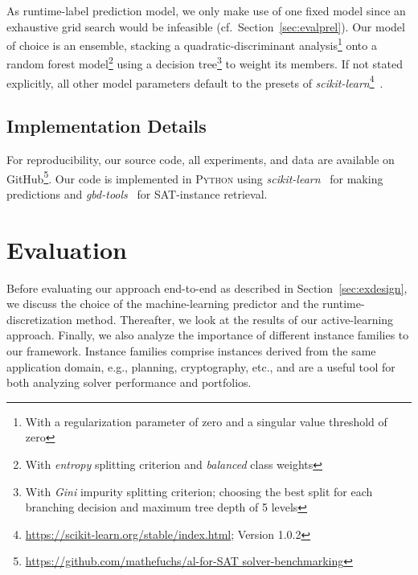 \documentclass[runningheads]{llncs}
\begin{document}
As runtime-label prediction model, we only make use of one fixed model since an exhaustive grid search would be infeasible (cf.~Section~\ref{sec:evalprel}).
Our model of choice is an ensemble, stacking a quadratic-discriminant analysis\footnote{With a regularization parameter of zero and a singular value threshold of zero} onto a random forest model\footnote{With \emph{entropy} splitting criterion and \emph{balanced} class weights} using a decision tree\footnote{With \emph{Gini} impurity splitting criterion; choosing the best split for each branching decision and maximum tree depth of 5 levels} to weight its members.
If not stated explicitly, all other model parameters default to the presets of \emph{scikit-learn}\footnote{\url{https://scikit-learn.org/stable/index.html}; Version 1.0.2}~\cite{scikit-learn}.


\subsection{Implementation Details}

For reproducibility, our source code, all experiments, and data are available on GitHub\footnote{\url{https://github.com/mathefuchs/al-for-SAT solver-benchmarking}}.
Our code is implemented in \textsc{Python} using \emph{scikit-learn}~\cite{scikit-learn} for making predictions and \emph{gbd-tools}~\cite{IserS18} for SAT-instance retrieval.


\section{Evaluation}
\label{sec:eval}

Before evaluating our approach end-to-end as described in Section~\ref{sec:exdesign}, we discuss the choice of the machine-learning predictor and the runtime-discretization method.
Thereafter, we look at the results of our active-learning approach.
Finally, we also analyze the importance of different instance families to our framework.
Instance families comprise instances derived from the same application domain, e.g., planning, cryptography, etc., and are a useful tool for both analyzing solver performance and portfolios.
\end{document}
